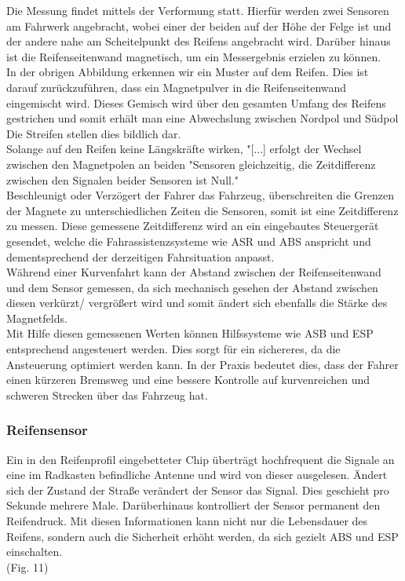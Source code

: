 	\begin{flushleft}
		
		Die Messung findet mittels der Verformung statt. Hierfür werden zwei Sensoren am Fahrwerk angebracht, wobei einer der beiden auf der Höhe der Felge ist und der andere nahe am Scheitelpunkt des Reifens angebracht wird. Darüber hinaus ist die Reifenseitenwand magnetisch, um ein Messergebnis erzielen zu können.\\
		In der obrigen Abbildung erkennen wir ein Muster auf dem Reifen. Dies ist darauf zurückzuführen, dass ein Magnetpulver in die Reifenseitenwand eingemischt wird. Dieses Gemisch wird über den gesamten Umfang des Reifens gestrichen und somit erhält man eine Abwechslung zwischen Nordpol und Südpol Die Streifen stellen dies bildlich dar.\\
		Solange auf den Reifen keine Längskräfte wirken, "[...] erfolgt der Wechsel zwischen den Magnetpolen an beiden "Sensoren gleichzeitig, die Zeitdifferenz zwischen den Signalen beider Sensoren ist Null."\cite{TS_swt} \\
		Beschleunigt oder Verzögert der Fahrer das Fahrzeug, überschreiten die Grenzen der Magnete zu unterschiedlichen Zeiten die Sensoren, somit ist eine Zeitdifferenz zu messen. Diese gemessene Zeitdifferenz wird an ein eingebautes Steuergerät gesendet, welche die Fahrassistenzsysteme wie ASR und ABS anspricht und dementsprechend der derzeitigen Fahrsituation anpasst.\\
		Während einer Kurvenfahrt kann der Abstand zwischen der Reifenseitenwand und dem Sensor gemessen, da sich mechanisch gesehen der Abstand zwischen diesen verkürzt/ vergrößert wird und somit ändert sich ebenfalls die Stärke des Magnetfelds.\\
		Mit Hilfe diesen gemessenen Werten können Hilfssysteme wie ASB und ESP entsprechend angesteuert werden. Dies sorgt für ein sichereres, da die Ansteuerung optimiert werden kann. In der Praxis bedeutet dies, dass der Fahrer einen kürzeren Bremsweg und eine bessere Kontrolle auf kurvenreichen und schweren Strecken über das Fahrzeug hat.
		
	\end{flushleft}
	
	\subsubsection{Reifensensor}
	Ein in den Reifenprofil eingebetteter Chip überträgt hochfrequent die Signale an eine im Radkasten befindliche Antenne und wird von dieser ausgelesen. Ändert sich der Zustand der Straße verändert der Sensor das Signal. Dies geschieht pro Sekunde mehrere Male. Darüberhinaus kontrolliert der Sensor permanent den Reifendruck. Mit diesen Informationen kann nicht nur die Lebensdauer des Reifens, sondern auch die Sicherheit erhöht werden, da sich gezielt ABS und ESP einschalten.\\(Fig. 11)
	
